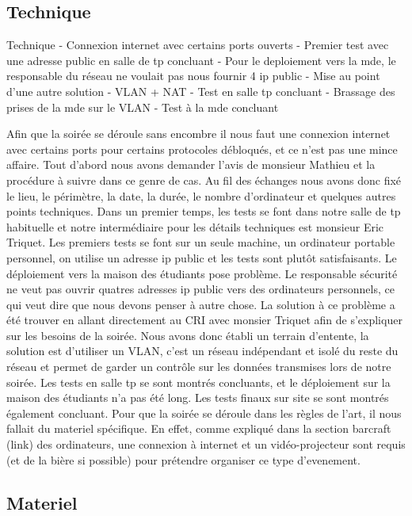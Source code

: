 \subsection{Technique}%
\label{sub:technique}

Technique
  - Connexion internet avec certains ports ouverts
  - Premier test avec une adresse public en salle de tp concluant
  - Pour le deploiement vers la mde, le responsable du réseau ne voulait pas nous fournir 4 ip public
  - Mise au point d'une autre solution
         - VLAN + NAT
  - Test en salle tp concluant
  - Brassage des prises de la mde sur le VLAN
  - Test à la mde concluant

Afin que la soirée se déroule sans encombre il nous faut une connexion
internet avec certains ports pour certains protocoles débloqués, et ce
n'est pas une mince affaire. Tout d'abord nous avons demander l'avis de
monsieur Mathieu et la procédure à suivre dans ce genre de cas.  Au fil
des échanges nous avons donc fixé le lieu, le périmètre, la date, la
durée, le nombre d'ordinateur et quelques autres points techniques.
Dans un premier temps, les tests se font dans notre salle de tp
habituelle et notre intermédiaire pour les détails techniques est
monsieur Eric Triquet.  Les premiers tests se font sur un seule machine,
un ordinateur portable personnel, on utilise un adresse ip public et les
tests sont plutôt satisfaisants.  Le déploiement vers la maison des
étudiants pose problème. Le responsable sécurité ne veut pas ouvrir
quatres adresses ip public vers des ordinateurs personnels, ce qui veut
dire que nous devons penser à autre chose.  La solution à ce problème a
été trouver en allant directement au CRI avec monsier Triquet afin de
s'expliquer sur les besoins de la soirée.  Nous avons donc établi un
terrain d'entente, la solution est d'utiliser un VLAN, c'est un réseau
indépendant et isolé du reste du réseau et permet de garder un contrôle
sur les données transmises lors de notre soirée.  Les tests en salle tp
se sont montrés concluants, et le déploiement sur la maison des
étudiants n'a pas été long.  Les tests finaux sur site se sont montrés
également concluant.
Pour que la soirée se déroule dans les règles de l'art, il nous fallait
du materiel spécifique. En effet, comme expliqué dans la section
barcraft (link) des ordinateurs, une connexion à internet et un
vidéo-projecteur sont requis (et de la bière si possible) pour prétendre
organiser ce type d'evenement.

\subsection{Materiel}%
\label{sub:materiel}

